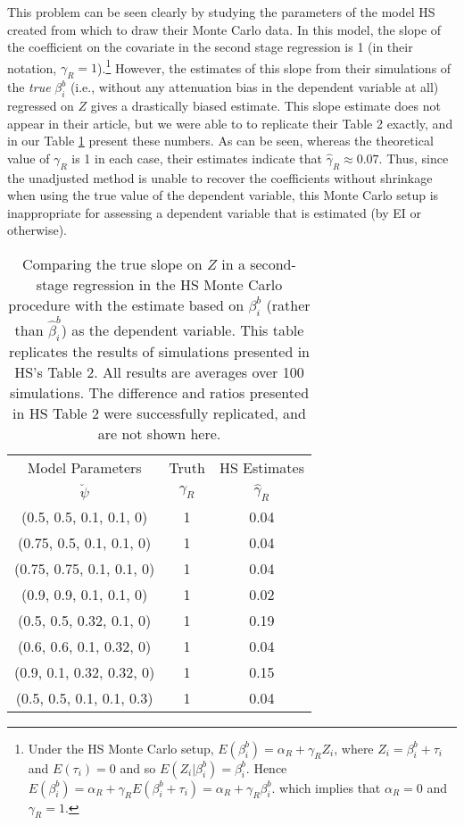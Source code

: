 \documentclass[11pt,titlepage]{article}
\begin{document}
This problem can be seen clearly by studying the parameters of the
model HS created from which to draw their Monte Carlo data.  In this
model, the slope of the coefficient on the covariate in the second
stage regression is 1 (in their notation,
$\gamma_R=1$).\footnote{Under the HS Monte Carlo setup,
  $E(\beta_i^b)=\alpha_R+\gamma_R Z_i$, where $Z_i=\beta_i^b+\tau_i$
  and $E(\tau_i)=0$ and so $E(Z_i|\beta_i^b)=\beta_i^b$.  Hence
  $E(\beta_i^b)=\alpha_R+\gamma_RE(\beta_i^b+\tau_i) =
  \alpha_R+\gamma_R\beta_i^b$.  which implies that $\alpha_R=0$ and
  $\gamma_R=1$.}  However, the estimates of this slope from their
simulations of the \emph{true} $\beta_i^b$ (i.e., without any
attenuation bias in the dependent variable at all) regressed on $Z$
gives a drastically biased estimate.  This slope estimate does not
appear in their article, but we were able to to replicate their Table
2 exactly, and in our Table \ref{t:hsrep} present these numbers.  As
can be seen, whereas the theoretical value of $\gamma_R$ is 1 in each
case, their estimates indicate that $\hat\gamma_R\approx 0.07$.  Thus,
since the unadjusted method is unable to recover the coefficients
without shrinkage when using the true value of the dependent variable,
this Monte Carlo setup is inappropriate for assessing a dependent
variable that is estimated (by EI or otherwise).
\begin{table}[tb]
\label{t:hsrep}
\begin{center}
\begin{tabular}{c|cc}
Model Parameters & Truth & \multicolumn{1}{c}{HS Estimates} \\
$\breve\psi$  & $\gamma_R$ & $\hat\gamma_R$ \\\hline
(0.5, 0.5, 0.1, 0.1, 0)  &1      &       0.04\\  
(0.75, 0.5, 0.1, 0.1, 0) &1      &       0.04  \\
(0.75, 0.75, 0.1, 0.1, 0)&1      &       0.04  \\
(0.9, 0.9, 0.1, 0.1, 0)  &1      &       0.02  \\
(0.5, 0.5, 0.32, 0.1, 0) &1      &       0.19  \\
(0.6, 0.6, 0.1, 0.32, 0) &1      &       0.04  \\
(0.9, 0.1, 0.32, 0.32, 0)&1      &       0.15  \\
(0.5, 0.5, 0.1, 0.1, 0.3)&1      &       0.04  \\
\hline
\end{tabular}
\end{center}
\caption{Comparing the true slope on $Z$ in a 
second-stage regression in the HS Monte Carlo 
procedure with the estimate based on $\beta_i^b$ 
(rather than $\hat\beta_i^b$) as the dependent variable.
This table replicates the results of simulations presented in
HS's Table 2.  All results are averages over 100 simulations.  
The difference and ratios presented in HS Table 2 were  
successfully replicated, and are not shown here.}
\end{table}
\end{document}
